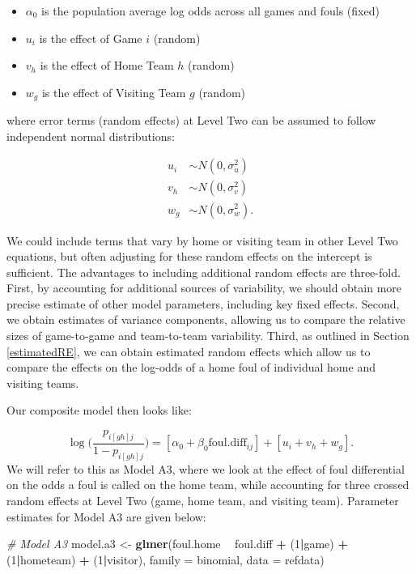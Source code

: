 \documentclass[
]{krantz}
\newenvironment{Shaded}{\begin{snugshade}}{\end{snugshade}}
\newcommand{\CommentTok}[1]{\textcolor[rgb]{0.37,0.37,0.37}{\textit{#1}}}
\newcommand{\DataTypeTok}[1]{\textcolor[rgb]{0.27,0.27,0.27}{#1}}
\newcommand{\DecValTok}[1]{\textcolor[rgb]{0.06,0.06,0.06}{#1}}
\newcommand{\KeywordTok}[1]{\textcolor[rgb]{0.27,0.27,0.27}{\textbf{#1}}}
\newcommand{\NormalTok}[1]{#1}
\newcommand{\OperatorTok}[1]{\textcolor[rgb]{0.43,0.43,0.43}{\textbf{#1}}}
\newcommand{\StringTok}[1]{\textcolor[rgb]{0.5,0.5,0.5}{#1}}
\providecommand{\tightlist}{%
  \setlength{\itemsep}{0pt}\setlength{\parskip}{0pt}}
\begin{document}
\begin{itemize}
\tightlist
\item
  \(\alpha_{0}\) is the population average log odds across all games and fouls (fixed)
\item
  \(u_{i}\) is the effect of Game \(i\) (random)
\item
  \(v_{h}\) is the effect of Home Team \(h\) (random)
\item
  \(w_{g}\) is the effect of Visiting Team \(g\) (random)
\end{itemize}

where error terms (random effects) at Level Two can be assumed to follow independent normal distributions:

\begin{align*}
u_{i} & \sim N \left( 0 , \sigma_{u}^{2} \right) \\
v_{h} & \sim N \left( 0 , \sigma_{v}^{2} \right) \\
w_{g} & \sim N \left( 0 , \sigma_{w}^{2} \right).
\end{align*}

We could include terms that vary by home or visiting team in other Level Two equations, but often adjusting for these random effects on the intercept is sufficient. The advantages to including additional random effects are three-fold. First, by accounting for additional sources of variability, we should obtain more precise estimate of other model parameters, including key fixed effects. Second, we obtain estimates of variance components, allowing us to compare the relative sizes of game-to-game and team-to-team variability. Third, as outlined in Section \ref{estimatedRE}, we can obtain estimated random effects which allow us to compare the effects on the log-odds of a home foul of individual home and visiting teams.

Our composite model then looks like:

\begin{equation*}
\log\bigg(\frac{p_{i[gh]j}}{1-p_{i[gh]j}}\bigg) = [\alpha_{0}+\beta_{0}\mathrm{foul.diff}_{ij}]+[u_{i}+v_{h}+w_{g}].
\end{equation*}
We will refer to this as Model A3, where we look at the effect of foul differential on the odds a foul is called on the home team, while accounting for three crossed random effects at Level Two (game, home team, and visiting team). Parameter estimates for Model A3 are given below:

\begin{Shaded}
\begin{Highlighting}[]
\CommentTok{# Model A3}
\NormalTok{model.a3 <-}\StringTok{ }\KeywordTok{glmer}\NormalTok{(foul.home }\OperatorTok{~}\StringTok{ }\NormalTok{foul.diff }\OperatorTok{+}\StringTok{ }\NormalTok{(}\DecValTok{1}\OperatorTok{|}\NormalTok{game) }\OperatorTok{+}\StringTok{ }
\StringTok{    }\NormalTok{(}\DecValTok{1}\OperatorTok{|}\NormalTok{hometeam) }\OperatorTok{+}\StringTok{ }\NormalTok{(}\DecValTok{1}\OperatorTok{|}\NormalTok{visitor), }
    \DataTypeTok{family =}\NormalTok{ binomial, }\DataTypeTok{data =}\NormalTok{ refdata)}
\end{Highlighting}
\end{Shaded}
\end{document}
